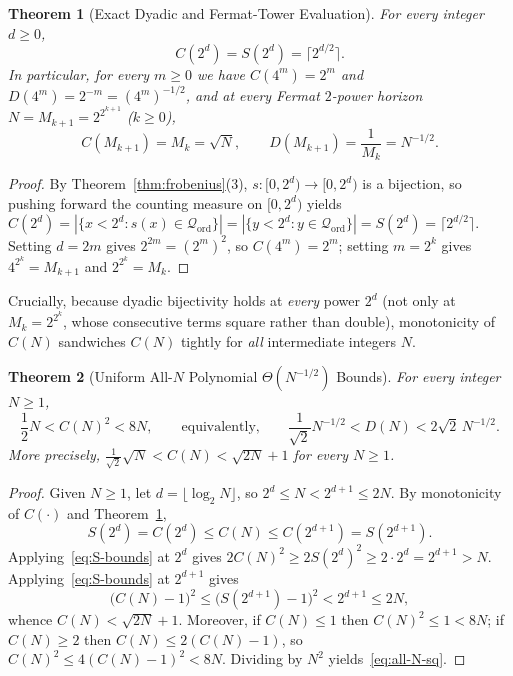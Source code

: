 \documentclass[11pt]{article}
\newtheorem{theorem}{Theorem}[section]
\theoremstyle{definition}
\theoremstyle{remark}
\begin{document}
\begin{theorem}[Exact Dyadic and Fermat-Tower Evaluation]\label{thm:dyadic-exact}
For every integer $d \ge 0$,
\[
  C(2^d) = S(2^d) = \bigl\lceil 2^{d/2} \bigr\rceil.
\]
In particular, for every $m \ge 0$ we have $C(4^m) = 2^m$ and $D(4^m) = 2^{-m} = (4^m)^{-1/2}$, and at every Fermat $2$-power horizon $N = M_{k+1} = 2^{2^{k+1}}$ ($k \ge 0$),
\[
  C(M_{k+1}) = M_k = \sqrt{N}, \qquad D(M_{k+1}) = \frac{1}{M_k} = N^{-1/2}.
\]
\end{theorem}

\begin{proof}
By Theorem~\ref{thm:frobenius}(3), $s : [0, 2^d) \to [0, 2^d)$ is a bijection, so pushing forward the counting measure on $[0, 2^d)$ yields $C(2^d) = |\{x < 2^d : s(x) \in \mathcal{Q}_{\mathrm{ord}}\}| = |\{y < 2^d : y \in \mathcal{Q}_{\mathrm{ord}}\}| = S(2^d) = \lceil 2^{d/2} \rceil$. Setting $d = 2m$ gives $2^{2m} = (2^m)^2$, so $C(4^m) = 2^m$; setting $m = 2^k$ gives $4^{2^k} = M_{k+1}$ and $2^{2^k} = M_k$.
\end{proof}

Crucially, because dyadic bijectivity holds at \emph{every} power $2^d$ (not only at $M_k = 2^{2^k}$, whose consecutive terms square rather than double), monotonicity of $C(N)$ sandwiches $C(N)$ tightly for \emph{all} intermediate integers $N$.

\begin{theorem}[Uniform All-$N$ Polynomial $\Theta(N^{-1/2})$ Bounds]\label{thm:poly-all-N}
For every integer $N \ge 1$,
\begin{equation}\label{eq:all-N-sq}
  \frac{1}{2} N < C(N)^2 < 8 N, \qquad\text{equivalently,}\qquad \frac{1}{\sqrt{2}} N^{-1/2} < D(N) < 2\sqrt{2}\, N^{-1/2}.
\end{equation}
More precisely, $\frac{1}{\sqrt{2}} \sqrt{N} < C(N) < \sqrt{2N} + 1$ for every $N \ge 1$.
\end{theorem}

\begin{proof}
Given $N \ge 1$, let $d = \lfloor \log_2 N \rfloor$, so $2^d \le N < 2^{d+1} \le 2N$. By monotonicity of $C(\cdot)$ and Theorem~\ref{thm:dyadic-exact},
\[
  S(2^d) = C(2^d) \le C(N) \le C(2^{d+1}) = S(2^{d+1}).
\]
Applying~\eqref{eq:S-bounds} at $2^d$ gives $2 C(N)^2 \ge 2 S(2^d)^2 \ge 2 \cdot 2^d = 2^{d+1} > N$. Applying~\eqref{eq:S-bounds} at $2^{d+1}$ gives
\[
  \bigl(C(N) - 1\bigr)^2 \le \bigl(S(2^{d+1}) - 1\bigr)^2 < 2^{d+1} \le 2N,
\]
whence $C(N) < \sqrt{2N} + 1$. Moreover, if $C(N) \le 1$ then $C(N)^2 \le 1 < 8N$; if $C(N) \ge 2$ then $C(N) \le 2(C(N)-1)$, so $C(N)^2 \le 4(C(N)-1)^2 < 8N$. Dividing by $N^2$ yields~\eqref{eq:all-N-sq}.
\end{proof}
\end{document}
